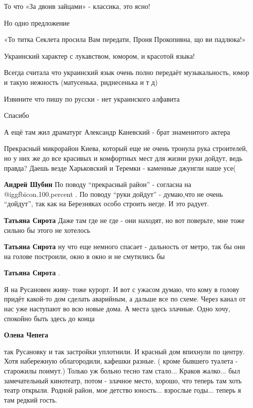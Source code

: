 \begin{itemize}
То что «За двоив зайцами» - классика, это ясно!

Но одно предложение

«То титка Секлета просила Вам передати, Проня Прокопивна, що ви падлюка!»

Украинский характер с лукавством, юмором, и красотой языка!

Всегда считала что украинский язык очень полно передаёт музыкальность, юмор и
такую нежность (матусенька, риднесенька и т д)

Извините что пишу по русски - нет украинского алфавита

Спасибо

А ещё там жил драматург Александр Каневский - брат знаменитого актера


Прекрасный микрорайон Киева, который еще не очень тронула рука строителей, но у
них же до все красивых и комфортных мест для жизни руки дойдут, ведь правда?
Даешь везде Харьковский и Теремки - каменные джунгли наше усе(

\begin{itemize} %
\textbf{Андрей Шубин} По поводу \enquote{прекрасный район} - согласна на  @igg{fbicon.100.percent} .
По поводу \enquote{руки дойдут} - думаю,что не очень \enquote{дойдут}, так как на Березняках особо строить негде.
И это радует.

\textbf{Татьяна Сирота} Даже там где не где - они находят, но вот поверьте, мне
тоже сильно бы этого не хотелось

\textbf{Татьяна Сирота} ну что еще немного спасает - дальность от метро, так бы
они на голове построили, окно в окно и не смутились бы

\textbf{Татьяна Сирота} . 

Я на Русановен живу- тоже курорт. И вот с ужасом думаю, что кому в голову
придёт какой-то дом сделать аварийным, а дальше все по схеме. Через канал от
нас уже наступают во всю новые дома. А места здесь злачные. Одно хочу, спокойно
быть здесь до конца

\textbf{Олена Чепега} 

так Русановку и так застройки уплотнили. И красный дом впихнули по центру. Хотя
набережную облагородили, кафешки разные. ( кроме бывшего туалета - старожилы
поимут.) Только уж больно тесно там стало... Краков жалко... был замечательный
кинотеатр, потом - злачное место, хорошо, что теперь там хоть театр открыли.
Родной район, мое детство юность... взрослые годы... теперь я там редкий гость.


\end{itemize}
\end{itemize}
